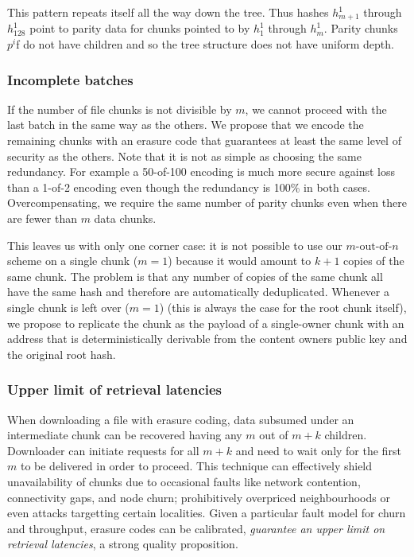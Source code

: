 This pattern repeats itself all the way down the tree. Thus hashes $h^1_{m+1}$ through $h^1_{128}$ point to parity data for chunks pointed to by $h^1_1$ through $h^1_{m}$. Parity chunks $p^i$f do not have children and so the tree structure does not have uniform depth.

\subsubsection{Incomplete batches}

If the number of file chunks is not divisible by $m$, we cannot proceed with the last batch in the same way as the others. We propose that we encode the remaining chunks with an erasure code that guarantees at least the same level of security as the others. Note that it is not as simple as choosing the same redundancy. For example a 50-of-100 encoding is much more secure against loss than a 1-of-2 encoding even though the redundancy is 100\% in both cases. Overcompensating, we require the same number of parity chunks even when there are fewer than $m$ data chunks.

This leaves us with only one corner case: it is not possible to use our $m\text{-out-of-}n$ scheme on a single chunk ($m=1$) because it would amount to $k+1$ copies of the same chunk. The problem is that any number of copies of the same chunk all have the same hash and therefore are automatically deduplicated. Whenever a single chunk is left over ($m=1$) (this is always the case for the root chunk itself), we propose to replicate the chunk as the payload of a single-owner chunk with an address that is deterministically derivable from the content owners public key and the original root hash. 

\subsubsection{Upper limit of retrieval latencies}

When downloading a file with erasure coding, data subsumed under an intermediate chunk can be recovered having any $m$ out of $m+k$ children. Downloader can initiate requests for all $m+k$ and need to wait  only for the first $m$ to be delivered in order to proceed.  
This technique can effectively shield unavailability of chunks due to occasional faults like network contention, connectivity gaps, and node churn; prohibitively overpriced neighbourhoods or even attacks targetting certain localities. Given a particular fault model for churn and throughput, erasure codes can be calibrated,
\emph{guarantee an upper limit on retrieval latencies}, a strong quality proposition.





